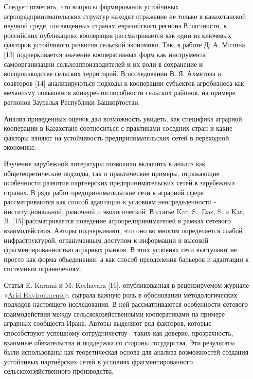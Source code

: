 \begin{multicols}{2}
Следует отметить, что вопросы формирования устойчивых
агропредпринимательских структур находят отражение не только в
казахстанской научной среде, посвященных странам евразийского региона.В
частности, в российских публикациях кооперация рассматривается как один
из ключевых факторов устойчивого развития сельской экономики. Так, в
работе Д. А. Митина {[}13{]} подчеркивается значение кооперативных форм
как инструмента самоорганизации сельхозпроизводителей и их роли в
сохранение и воспроизводстве сельских территорий. В исследовании В. Я.
Ахметова и соавторов {[}14{]} анализируються подходы к кооперации
субъектов агробизнеса как механизму повышения конкурентоспособности
сельских районов, на примере регионов Зауралья Республики Башкортостан.

Анализ приведенных оценок дал возможность увидеть, как специфика
аграрной кооперации в Казахстане соотноситься с практиками соседних
стран и какие факторы влияют на устойчивость предпринимательских сетей в
переходной экономике.

Изучение зарубежной литературы позволило включить в анализ как
общетеоретические подходы, так и практические примеры, отражающие
особенности развития партнерских предпринимательских сетей в зарубежных
странах. В ряде работ предпринимательские сети в аграрной сфере
рассматриваются как способ адаптации к условиям неопределенности -
институциональной, рыночной и экологической. В статье Kar, S., Das, S. и
Kar, B. {[}15{]} рассматривается поведение агропредпринимателей в рамках
сетевого взаимодействия. Авторы подчеркивают, что оно во многом
определяется слабой инфраструктурой, ограниченным доступом к информации
и высокой фрагментированностью аграрных рынков. В этих условиях сети
выступают не просто как форма объединения, а как способ преодоления
барьеров и адаптации к системным ограничениям.

Статья E. Karami и M. Keshavarz {[}16{]}, опубликованная в рецензируемом
журнале
«\href{https://www.sciencedirect.com/journal/journal-of-arid-environments}{Arid
Environments}», сыграла важную роль в обосновании методологических
подходов настоящего исследования. В ней рассматриваются особенности
сетевого взаимодействия между сельскохозяйственными кооперативами на
примере аграрных сообществ Ирана. Авторы выделяют ряд факторов, которые
способствуют успешному сотрудничеству - таких как доверие, прозрачность,
взаимные обязательства и поддержка со стороны государства. Эти
результаты были использованы как теоретическая основа для анализа
возможностей создания устойчивых партнёрских сетей в условиях
фрагментированного сельскохозяйственного производства.


\end{multicols}
